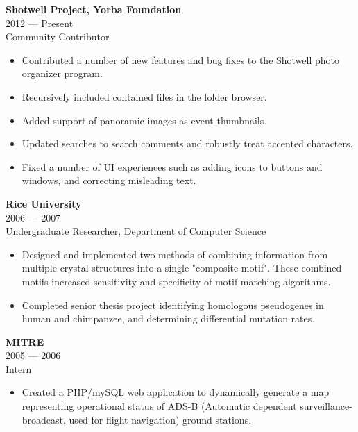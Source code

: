 \textbf{Shotwell Project, Yorba Foundation}\\
2012 --- Present\\
Community Contributor\\
\begin{itemize}[topsep=1ex, partopsep=0ex, parsep=0ex, itemsep=0.5ex]
    \item Contributed a number of new features and bug fixes to the Shotwell photo organizer program.
    \item Recursively included contained files in the folder browser.
    \item Added support of panoramic images as event thumbnails.
    \item Updated searches to search comments and robustly treat accented characters.
    \item Fixed a number of UI experiences such as adding icons to buttons and windows, and correcting misleading text.
\end{itemize}

\textbf{Rice University}\\
2006 --- 2007\\
Undergraduate Researcher, Department of Computer Science\\ 
\begin{itemize}[topsep=1ex, partopsep=0ex, parsep=0ex, itemsep=0.5ex]
    \item Designed and implemented two methods of combining information from multiple crystal structures into a single "composite motif". These combined motifs increased sensitivity and specificity of motif matching algorithms.
    \item Completed senior thesis project identifying homologous pseudogenes in human and chimpanzee, and determining differential mutation rates.
\end{itemize}

\vspace{\mybigskip}
\textbf{MITRE}\\
2005 --- 2006\\
Intern\\
\begin{itemize}[topsep=1ex, partopsep=0ex, parsep=0ex, itemsep=0.5ex]
    \item Created a PHP/mySQL web application to dynamically generate a map representing operational status of ADS-B (Automatic dependent surveillance-broadcast, used for flight navigation) ground stations.
\end{itemize}

